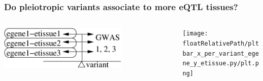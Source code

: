 \documentclass{beamer}
\newcommand*{\floatRelativePath}{../out/gwas417/pval_5e-08/r2_0.1/kb_1000/window_1000000/75_50}%
\begin{document}
        \begin{frame}
            \frametitle{Do pleiotropic variants associate to more eQTL tissues?}

            \begin{columns}
                \begin{column}{0.5\textwidth}
                    \begin{center}
                        \includegraphics[width=0.7\textwidth]{../presentation_230120_gold2022_paris/fig/model_pleio_etissues.png}
                    \end{center}
                \end{column}
                \begin{column}{0.5\textwidth}  %
                    \begin{center}
                        \texttt{[image: \\floatRelativePath/pltbar\_x\_per\_variant\_egene\_y\_etissue.py/plt.png]}
                    \end{center}
                \end{column}
            \end{columns}

        \end{frame}
\end{document}
